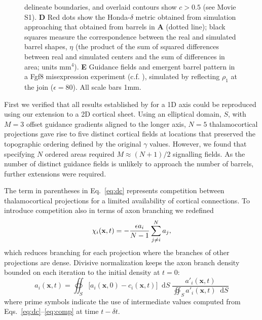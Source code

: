 \documentclass[9pt,lineno]{elife}
\newcommand*\dif{\mathop{}\!\mathrm{d}}
\begin{document}
\begin{figure}
\begin{fullwidth}
{  delineate boundaries, and overlaid contours show $c>0.5$ (see Movie
  S1). \textbf{D} Red dots show the Honda-$\delta$ metric obtained from
  simulation approaching that obtained from barrels in \textbf{A} (dotted
  line); black squares measure the correspondence between the real and
  simulated barrel shapes, $\eta$ (the product of the sum of squared
  differences between real and simulated centers and the sum of differences in
  area; units mm$^4$). \textbf{E} Guidance fields and emergent barrel pattern
  in a Fgf8 misexpression experiment
  (c.f. \citealp{assimacopoulos_fibroblast_2012}), simulated by reflecting
  $\rho_1$ at the join ($\epsilon=80$). All scale bars 1mm.}
\label{fig:main}
\end{fullwidth}
\end{figure}

First we verified that all results established by \cite{karbowski_model_2004}
for a 1D axis could be reproduced using our extension to a 2D cortical
sheet. Using an elliptical domain, $S$, with $M=3$ offset guidance gradients
aligned to the longer axis, $N=5$ thalamocortical projections gave rise to
five distinct cortical fields at locations that preserved the topographic
ordering defined by the original $\gamma$ values. However, we found that
specifying $N$ ordered areas required $M\approx (N+1)/2$ signalling fields. As
the number of distinct guidance fields is unlikely to approach the number of
barrels, further extensions were required.

The term in parentheses in Eq.~\ref{eq:dc} represents competition between
thalamocortical projections for a limited availability of cortical
connections. To introduce competition also in terms of axon branching we
redefined
%
\begin{equation} \label{eq:comp}
\chi_i(\mathbf{x}, t) = - \frac{\epsilon  a_i}{N-1} \sum_{j \ne i}^{N} a_{j},
\end{equation}
%
which reduces branching for each projection where the branches of other
projections are dense. Divisive normalization keeps the axon branch density
bounded on each iteration to the initial density  at $t=0$:
%
\begin{equation} \label{eq:norm}
  a_i(\mathbf{x}, t) = \oiint_{S} \big[ a_i(\mathbf{x}, 0) - c_i(\mathbf{x}, t) \big] \dif S \; \frac {a'_i(\mathbf{x}, t)} {\oiint_{S}
  a'_i(\mathbf{x}, t) \dif S}
\end{equation}
%
where prime symbols indicate the use of intermediate values computed from
Eqs.~\ref{eq:dc}--\ref{eq:comp} at time $t-{\delta}t$. 
\end{document}
